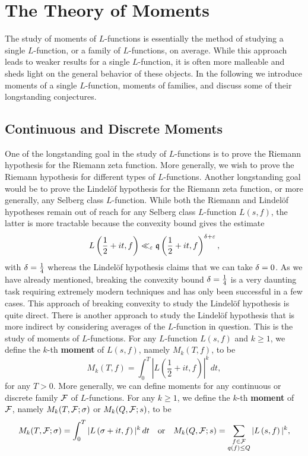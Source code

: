 \chapter{The Theory of Moments}
  The study of moments of $L$-functions is essentially the method of studying a single $L$-function, or a family of $L$-functions, on average. While this approach leads to weaker results for a single $L$-function, it is often more malleable and sheds light on the general behavior of these objects. In the following we introduce moments of a single $L$-function, moments of families, and discuss some of their longstanding conjectures.
\section{Continuous and Discrete Moments}
  One of the longstanding goal in the study of $L$-functions is to prove the Riemann hypothesis for the Riemann zeta function. More generally, we wish to prove the Riemann hypothesis for different types of $L$-functions. Another longstanding goal would be to prove the Lindel\"of hypothesis for the Riemann zeta function, or more generally, any Selberg class $L$-function. While both the Riemann and Lindel\"of hypotheses remain out of reach for any Selberg class $L$-function $L(s,f)$, the latter is more tractable because the convexity bound gives the estimate
  \[
    L\left(\frac{1}{2}+it,f\right) \ll_{\varepsilon} \mathfrak{q}\left(\frac{1}{2}+it,f\right)^{\delta+\varepsilon},
  \]
  with $\delta = \frac{1}{4}$ whereas the Lindel\"of hypothesis claims that we can take $\delta = 0$. As we have already mentioned, breaking the convexity bound $\delta = \frac{1}{4}$ is a very daunting task requiring extremely modern techniques and has only been successful in a few cases. This approach of breaking convexity to study the Lindel\"of hypothesis is quite direct. There is another approach to study the Lindel\"of hypothesis that is more indirect by considering averages of the $L$-function in question. This is the study of moments of $L$-functions. For any $L$-function $L(s,f)$ and $k \ge 1$, we define the $k$-th \textbf{moment} of $L(s,f)$, namely $M_{k}(T,f)$, to be
  \[
    M_{k}(T,f) = \int_{0}^{T}\left|L\left(\frac{1}{2}+it,f\right)\right|^{k}\,dt,
  \]
  for any $T > 0$. More generally, we can define moments for any continuous or discrete family $\mathcal{F}$ of $L$-functions. For any $k \ge 1$, we define the $k$-th \textbf{moment} of $\mathcal{F}$, namely $M_{k}(T,\mathcal{F};\sigma)$ or $M_{k}(Q,\mathcal{F};s)$, to be
  \[
    M_{k}(T,\mathcal{F};\sigma) = \int_{0}^{T}|L\left(\sigma+it,f\right)|^{k}\,dt \quad \text{or} \quad M_{k}(Q,\mathcal{F};s) = \sum_{\substack{f \in \mathcal{F} \\ q(f) \le Q}}|L\left(s,f\right)|^{k},
  \]
